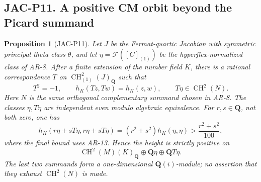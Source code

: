 \documentclass[11pt,a4paper]{article}
\newtheorem{proposition}[theorem]{Proposition}
\begin{document}
\subsection*{JAC-P11. A positive CM orbit beyond the Picard summand}

\begin{proposition}[JAC-P11]\label{jac:P11}
Let $J$ be the Fermat-quartic Jacobian with symmetric principal theta
class $\theta$, and let $\eta=\mathcal F([C]_{(1)})$ be the
hyperflex-normalized class of AR-8. After a finite extension of the
number field $K$, there is a rational correspondence $T$ on
$\operatorname{CH}^2_{(1)}(J)_{\mathbf Q}$ such that
\[
 T^2=-1,\qquad h_K(Tz,Tw)=h_K(z,w),\qquad
 T\eta\in\operatorname{CH}^2(N).                       \tag{JAC.P11.1}
\]
Here $N$ is the same orthogonal complementary summand chosen in AR-8.
The classes $\eta,T\eta$ are independent even modulo algebraic
equivalence. For $r,s\in\mathbf Q$, not both zero, one has
\[
 h_K(r\eta+sT\eta,r\eta+sT\eta)
   =(r^2+s^2)h_K(\eta,\eta)>\frac{r^2+s^2}{100},        \tag{JAC.P11.2}
\]
where the final bound uses AR-13. Hence the height is strictly
positive on
\[
 \operatorname{CH}^2(M)(K)_{\mathbf Q}
       \oplus\mathbf Q\eta\oplus\mathbf Q T\eta.        \tag{JAC.P11.3}
\]
The last two summands form a one-dimensional $\mathbf Q(i)$-module;
no assertion that they exhaust $\operatorname{CH}^2(N)$ is made.
\end{proposition}
\end{document}
